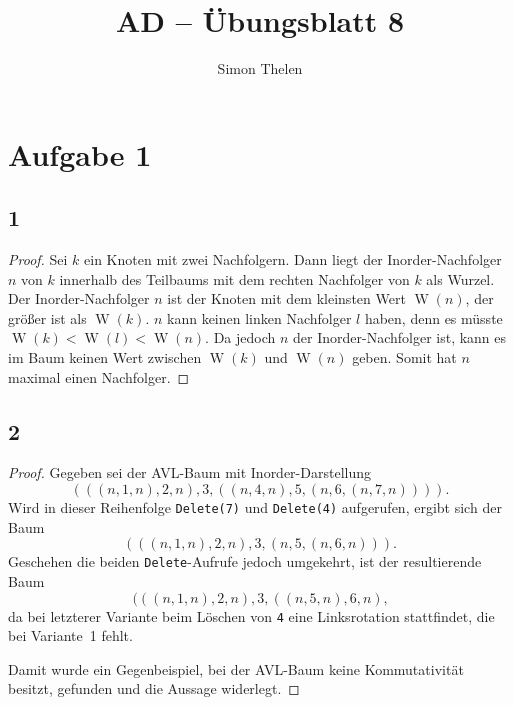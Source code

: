 \documentclass[a4paper, 11pt]{article}
\title{AD -- Übungsblatt 8}
\author{Simon Thelen}
\newcommand{\W}{\operatorname{W}}
\begin{document}
\maketitle

\section*{Aufgabe 1}

\subsection*{1}
\begin{proof}
    Sei $k$ ein Knoten mit zwei Nachfolgern. Dann liegt der Inorder-Nachfolger $n$ von $k$ innerhalb des Teilbaums mit dem rechten Nachfolger von $k$ als Wurzel.
    Der Inorder-Nachfolger $n$ ist der Knoten mit dem kleinsten Wert $\W(n)$, der größer ist als $\W(k)$.
    $n$ kann keinen linken Nachfolger $l$ haben, denn es müsste $\W(k) < \W(l) < \W(n)$.
    Da jedoch $n$ der Inorder-Nachfolger ist, kann es im Baum keinen Wert zwischen $\W(k)$ und $\W(n)$ geben.
    Somit hat $n$ maximal einen Nachfolger.
\end{proof}

\subsection*{2}
\begin{proof}
    Gegeben sei der AVL-Baum mit Inorder-Darstellung
    \begin{equation*}
        (((n, 1, n), 2, n), 3, ((n, 4, n), 5, (n, 6, (n, 7, n))))
        \text{.}
    \end{equation*}
    Wird in dieser Reihenfolge \texttt{Delete(7)} und \texttt{Delete(4)} aufgerufen, ergibt sich der Baum
    \begin{equation*}
        (((n, 1, n), 2, n), 3, (n, 5, (n, 6, n)))
        \text{.}
    \end{equation*}
    Geschehen die beiden \texttt{Delete}-Aufrufe jedoch umgekehrt, ist der resultierende Baum
    \begin{equation*}
        (((n, 1, n), 2, n), 3, ((n, 5, n), 6, n)
        \text{,}
    \end{equation*}
    da bei letzterer Variante beim Löschen von \texttt{4} eine Linksrotation stattfindet, die bei Variante~1 fehlt.

    Damit wurde ein Gegenbeispiel, bei der AVL-Baum keine Kommutativität besitzt, gefunden und die Aussage widerlegt.
\end{proof}
\end{document}
